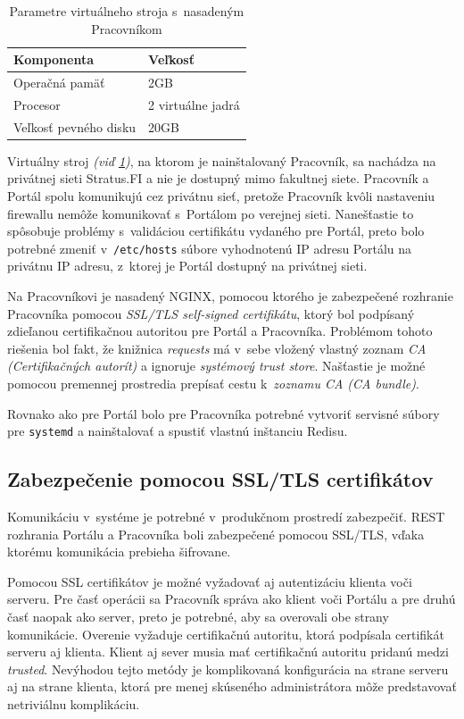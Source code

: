 \documentclass[
  digital, %
  oneside, %
  table,   %
  lof,     %
  lot,   %
]{fithesis3}
\begin{document}
\begin{table}[h]
\begin{tabular}{l l}
Komponenta & Veľkosť \\ [0.5ex] 
\hline
Operačná pamäť & 2GB  \\
Procesor & 2 virtuálne jadrá  \\
Veľkosť pevného disku&  20GB \\
\end{tabular}
\caption{Parametre virtuálneho stroja s~nasadeným Pracovníkom} \label{tab:machine-worker}
\end{table}

Virtuálny stroj \emph{(viď \ref{tab:machine-worker})}, na ktorom je nainštalovaný Pracovník, sa nachádza na privátnej sieti Stratus.FI a nie je dostupný mimo fakultnej siete. Pracovník a Portál spolu komunikujú cez privátnu sieť, pretože Pracovník kvôli nastaveniu firewallu nemôže komunikovať s~Portálom po verejnej sieti. Nanešťastie to spôsobuje problémy s~validáciou certifikátu vydaného pre Portál, preto bolo potrebné zmeniť v~\texttt{/etc/hosts} súbore vyhodnotenú IP adresu Portálu na privátnu IP adresu, z~ktorej je Portál dostupný na privátnej sieti.

Na Pracovníkovi je nasadený NGINX, pomocou ktorého je zabezpečené rozhranie Pracovníka pomocou \emph{SSL/TLS self-signed certifikátu}, ktorý bol podpísaný zdieľanou certifikačnou autoritou pre Portál a Pracovníka. Problémom tohoto riešenia bol fakt, že knižnica \emph{requests} má v~sebe vložený vlastný zoznam \emph{CA (Certifikačných autorít)}\cite{RFC5280} a ignoruje \emph{systémový trust store}. Našťastie je možné pomocou premennej prostredia prepísať cestu k~\emph{zoznamu CA (CA bundle)}.

Rovnako ako pre Portál bolo pre Pracovníka potrebné vytvoriť servisné súbory pre \texttt{systemd} a nainštalovať a spustiť vlastnú inštanciu Redisu.

\subsection{Zabezpečenie pomocou SSL/TLS certifikátov}

Komunikáciu v~systéme je potrebné v~produkčnom prostredí zabezpečiť. REST rozhrania Portálu a Pracovníka boli zabezpečené pomocou SSL/TLS, vďaka ktorému komunikácia prebieha šifrovane. 

Pomocou SSL certifikátov je možné vyžadovať aj autentizáciu klienta voči serveru.
Pre časť operácii sa Pracovník správa ako klient voči Portálu a pre druhú časť naopak ako server, preto je potrebné, aby sa overovali obe strany komunikácie. Overenie vyžaduje certifikačnú autoritu, ktorá podpísala certifikát serveru aj klienta\cite{RFC2818}. Klient aj sever musia mať certifikačnú autoritu pridanú medzi \emph{trusted}. Nevýhodou tejto metódy je komplikovaná konfigurácia na strane serveru aj na strane klienta, ktorá pre menej skúseného administrátora môže predstavovať netriviálnu komplikáciu.
\end{document}
